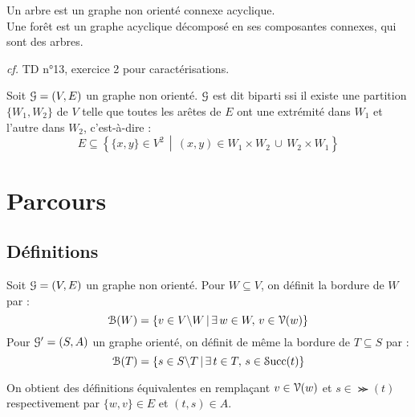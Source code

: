 		\begin{Definition}
			Un arbre est un graphe non orienté connexe acyclique. \\
			Une forêt est un graphe acyclique décomposé en ses composantes connexes, qui sont des arbres.
		\end{Definition}
	
			\emph{cf.} TD n°13, exercice 2 pour caractérisations.
		
		\eqskip{3mm}
		\begin{Definition}
			Soit \(\EuScript{G} = (V,E)\) un graphe non orienté. \(\EuScript{G}\) est dit biparti ssi il existe une partition \(\{W_1,W_2\}\) de \(V\) telle que toutes les arêtes de \(E\) ont une extrémité dans \(W_1\) et l'autre dans \(W_2\), c'est-à-dire :
				\[
					E \subseteq \left\{\!\{x,y\}\in V^2\,\middle|\, (x,y) \in W_1\!\times\! W_2 \,\cup\, W_2\!\times\! W_1\right\}
				\]
		\end{Definition}
		
		\begin{Illustration}
			
		\end{Illustration}
	

\section{Parcours}

	\subsection{Définitions}
		
		\begin{Definition}[bordure]
			Soit \(\EuScript{G} = (V,E)\) un graphe non orienté. Pour \(W \subseteq V\), on définit la bordure de \(W\) par :
				\[
					\EuScript{B}(W) = \{v\in V\backslash W\,|\, \exists\,w\in W,\, v\in \EuScript{V}(w)\}
				\]
			Pour \(\EuScript{G}' = (S,A)\) un graphe orienté, on définit de même la bordure de  \(T\subseteq S\) par :
				\[
					\EuScript{B}(T) = \{s\in S\backslash T\,|\, \exists\,t\in T,\, s\in \EuScript{S}\text{{ucc}}(t)\}
				\]
		\end{Definition}
		
		\begin{Remarque}
			On obtient des définitions équivalentes en remplaçant \(v\in\EuScript{V}(w)\) et \(s\in\Succ(t)\) respectivement par \(\{w,v\}\in E\) et \((t,s)\in A\).
		\end{Remarque}
		
